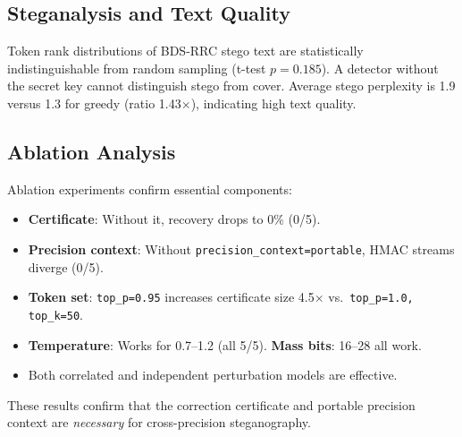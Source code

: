 \subsection{Steganalysis and Text Quality}

Token rank distributions of BDS-RRC stego text are statistically indistinguishable from random sampling (t-test $p = 0.185$). A detector without the secret key cannot distinguish stego from cover. Average stego perplexity is 1.9 versus 1.3 for greedy (ratio 1.43$\times$), indicating high text quality.

\subsection{Ablation Analysis}

Ablation experiments confirm essential components:
\begin{itemize}[leftmargin=*]
  \item \textbf{Certificate}: Without it, recovery drops to 0\% (0/5).
  \item \textbf{Precision context}: Without \texttt{precision\_context=portable}, HMAC streams diverge (0/5).
  \item \textbf{Token set}: \texttt{top\_p=0.95} increases certificate size 4.5$\times$ vs.\ \texttt{top\_p=1.0, top\_k=50}.
  \item \textbf{Temperature}: Works for 0.7--1.2 (all 5/5). \textbf{Mass bits}: 16--28 all work.
  \item Both correlated and independent perturbation models are effective.
\end{itemize}

These results confirm that the correction certificate and portable precision context are \emph{necessary} for cross-precision steganography.
